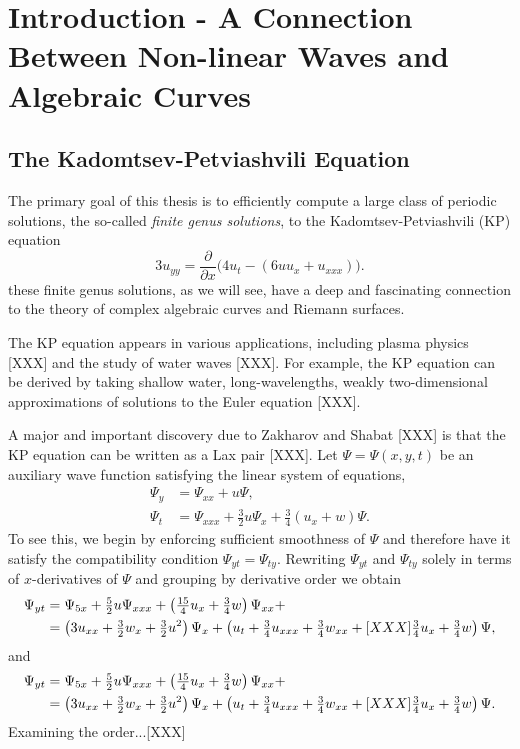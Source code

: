 \chapter{Introduction - A Connection Between Non-linear Waves and Algebraic Curves}

\section{The Kadomtsev-Petviashvili Equation}

The primary goal of this thesis is to efficiently compute a large class of
periodic solutions, the so-called {\it finite genus solutions}, to the
Kadomtsev-Petviashvili (KP) equation
\begin{equation} \label{eqn:kp}
  3u_{yy} = \frac{\partial}{\partial x} \big(
  4u_t - ( 6uu_x + u_{xxx} )
  \big).
\end{equation}
these finite genus solutions, as we will see, have a deep and fascinating
connection to the theory of complex algebraic curves and Riemann surfaces.

The KP equation appears in various applications, including plasma physics [XXX]
and the study of water waves [XXX]. For example, the KP equation can be derived
by taking shallow water, long-wavelengths, weakly two-dimensional
approximations of solutions to the Euler equation [XXX].

A major and important discovery due to Zakharov and Shabat [XXX] is that the KP
equation can be written as a Lax pair [XXX]. Let $\Psi = \Psi(x,y,t)$ be an
auxiliary wave function satisfying the linear system of equations,
\begin{align} \label{eqn:lax:pair}
  \Psi_y &= \Psi_{xx} + u\Psi, \label{eqn:lax-pair-a} \\ \Psi_t &= \Psi_{xxx} +
  \tfrac{3}{2}u \Psi_x + \tfrac{3}{4}(u_x + w)\Psi. \label{eqn:lax-pair-b}
\end{align}
To see this, we begin by enforcing sufficient smoothness of $\Psi$ and
therefore have it satisfy the compatibility condition $\Psi_{yt} =
\Psi_{ty}$. Rewriting $\Psi_{yt}$ and $\Psi_{ty}$ solely in terms of
$x$-derivatives of $\Psi$ and grouping by derivative order we obtain
\begin{align} \label{eqn:compatibility-expansion}
  \Psi_{yt}
  &=
  \Psi_{5x} + \tfrac{5}{2}u \Psi_{xxx} +
  \left( \tfrac{15}{4} u_x + \tfrac{3}{4} w \right)\Psi_{xx} + \notag \\
  &=
  \left( 3u_{xx} + \tfrac{3}{2} w_x + \tfrac{3}{2} u^2 \right)\Psi_x +
  \left( u_t + \tfrac{3}{4} u_{xxx} + \tfrac{3}{4} w_{xx} + [XXX]
  \tfrac{3}{4}u_x + \tfrac{3}{4} w \right) \Psi,
\end{align}
and
\begin{align}
  \Psi_{yt}
  &=
  \Psi_{5x} + \tfrac{5}{2}u \Psi_{xxx} +
  \left( \tfrac{15}{4} u_x + \tfrac{3}{4} w \right)\Psi_{xx} + \notag \\
  &=
  \left( 3u_{xx} + \tfrac{3}{2} w_x + \tfrac{3}{2} u^2 \right)\Psi_x +
  \left( u_t + \tfrac{3}{4} u_{xxx} + \tfrac{3}{4} w_{xx} + [XXX]
  \tfrac{3}{4}u_x + \tfrac{3}{4} w \right) \Psi.
\end{align}
Examining the order...[XXX]

